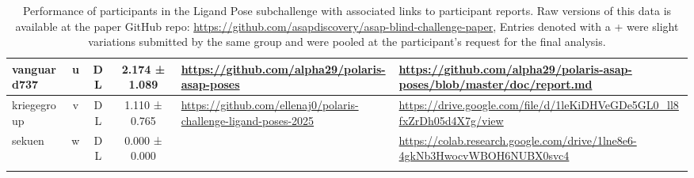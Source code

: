 \documentclass[journal=jcim,manuscript=suppinfo]{achemso}
\begin{document}
{\begin{longtable}{|p{2cm}|c|c|c|p{4cm}|p{6cm}|}
vanguard737 & u & DL & 2.174 ± 1.089 & \url{https://github.com/alpha29/polaris-asap-poses} & \url{https://github.com/alpha29/polaris-asap-poses/blob/master/doc/report.md} \\
\hline

kriegegroup & v & DL & 1.110 ± 0.765 & \url{https://github.com/ellenaj0/polaris-challenge-ligand-poses-2025} & \url{https://drive.google.com/file/d/1leKiDHVeGDe5GL0_ll8fxZrDh05d4X7g/view} \\
\hline

sekuen & w & DL & 0.000 ± 0.000 &   & \url{https://colab.research.google.com/drive/1lne8e6-4gkNb3HwocvWBOH6NUBX0svc4} \\
\hline

\caption{Performance of participants in the Ligand Pose subchallenge with associated links to participant reports. Raw versions of this data is available at the paper GitHub repo: \url{https://github.com/asapdiscovery/asap-blind-challenge-paper}, Entries denoted with a + were slight variations submitted by the same group and were pooled at the participant's request for the final analysis.}
\label{tab:admet_results}
\end{longtable}
}


\newpage
\end{document}
